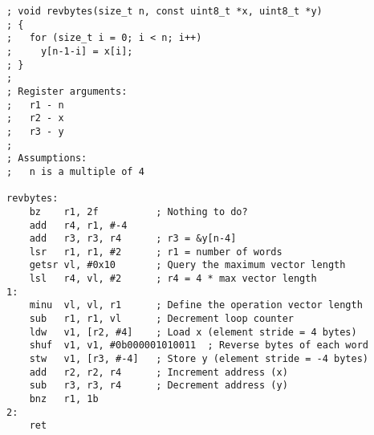 \begin{lstlisting}[style=assembler]
; void revbytes(size_t n, const uint8_t *x, uint8_t *y)
; {
;   for (size_t i = 0; i < n; i++)
;     y[n-1-i] = x[i];
; }
;
; Register arguments:
;   r1 - n
;   r2 - x
;   r3 - y
;
; Assumptions:
;   n is a multiple of 4

revbytes:
    bz    r1, 2f          ; Nothing to do?
    add   r4, r1, #-4
    add   r3, r3, r4      ; r3 = &y[n-4]
    lsr   r1, r1, #2      ; r1 = number of words
    getsr vl, #0x10       ; Query the maximum vector length
    lsl   r4, vl, #2      ; r4 = 4 * max vector length
1:
    minu  vl, vl, r1      ; Define the operation vector length
    sub   r1, r1, vl      ; Decrement loop counter
    ldw   v1, [r2, #4]    ; Load x (element stride = 4 bytes)
    shuf  v1, v1, #0b000001010011  ; Reverse bytes of each word
    stw   v1, [r3, #-4]   ; Store y (element stride = -4 bytes)
    add   r2, r2, r4      ; Increment address (x)
    sub   r3, r3, r4      ; Decrement address (y)
    bnz   r1, 1b
2:
    ret
\end{lstlisting}
